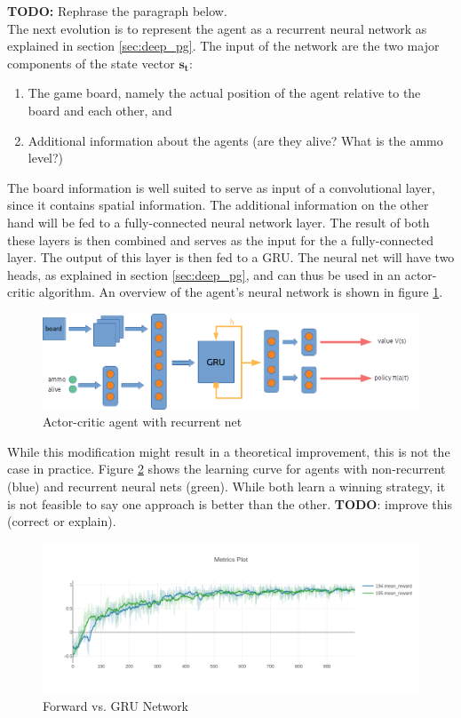 \textbf{TODO:} Rephrase the paragraph below.\\
The next evolution is to represent the agent as a recurrent neural network as explained in section \ref{sec:deep_pg}. The input of the network are the two major components of the state vector $\bm{s_t}$:
\begin{enumerate}
    \item The game board, namely the actual position of the agent relative to the board and each other, and
    \item Additional information about the agents (are they alive? What is the ammo level?)
\end{enumerate}
The board information is well suited to serve as input of a convolutional layer, since it contains spatial information. The additional information on the other hand will be fed to a fully-connected neural network layer. The result of both these layers is then combined and serves as the input for the a fully-connected layer. The output of this layer is then fed to a GRU. The neural net will have two heads, as explained in section \ref{sec:deep_pg}, and can thus be used in an actor-critic algorithm. An overview of the agent's neural network is shown in figure \ref{fig:agent_net}.
\begin{figure}[htp]
    \centering
    \includegraphics[width=16cm]{images/agent_net.png}
    \caption{Actor-critic agent with recurrent net}
    \label{fig:agent_net}
\end{figure}

While this modification might result in a theoretical improvement, this is not the case in practice. Figure \ref{fig:newplot194_195} shows the learning curve for agents with non-recurrent (blue) and recurrent neural nets (green). While both learn a winning strategy, it is not feasible to say one approach is better than the other. \textbf{TODO}: improve this (correct or explain).

\begin{figure}[htp]
    \centering
    \includegraphics[width=16cm]{images/experiment2/newplot194_195.png}
    \caption{Forward vs. GRU Network}
    \label{fig:newplot194_195}
\end{figure}

